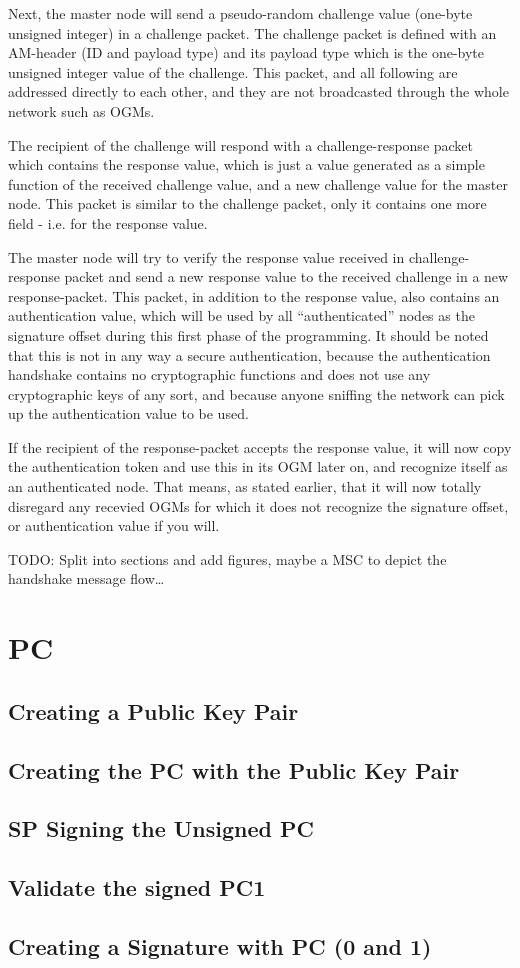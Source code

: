 Next, the master node will send a pseudo-random challenge value (one-byte
unsigned integer) in a challenge packet. The challenge packet is defined with an
\ac{AM}-header (ID and payload type) and its payload type which is the one-byte
unsigned integer value of the challenge. This packet, and all following are
addressed directly to each other, and they are not broadcasted through the whole
network such as \acp{OGM}.

The recipient of the challenge will respond with a challenge-response packet
which contains the response value, which is just a value generated as a simple
function of the received challenge value, and a new challenge value for the
master node. This packet is similar to the challenge packet, only it contains
one more field - i.e. for the response value.

The master node will try to verify the response value received in
challenge-response packet and send a new response value to the received
challenge in a new response-packet. This packet, in addition to the response
value, also contains an authentication value, which will be used by all
``authenticated'' nodes as the signature offset during this first phase of the
programming. It should be noted that this is not in any way a secure
authentication, because the authentication handshake contains no cryptographic
functions and does not use any cryptographic keys of any sort, and because
anyone sniffing the network can pick up the authentication value to be used.

If the recipient of the response-packet accepts the response value, it will now
copy the authentication token and use this in its \ac{OGM} later on, and
recognize itself as an authenticated node. That means, as stated earlier, that
it will now totally disregard any recevied \acp{OGM} for which it does not
recognize the signature offset, or authentication value if you will.

TODO: Split into sections and add figures, maybe a MSC to depict the handshake
message flow\ldots

\section{\acf{PC}}

\subsection{Creating a Public Key Pair}

\subsection{Creating the \ac{PC} with the Public Key Pair}

\subsection{\ac{SP} Signing the Unsigned \ac{PC}}

\subsection{Validate the signed \ac{PC1}}

\subsection{Creating a Signature with \ac{PC} (0 and 1)}